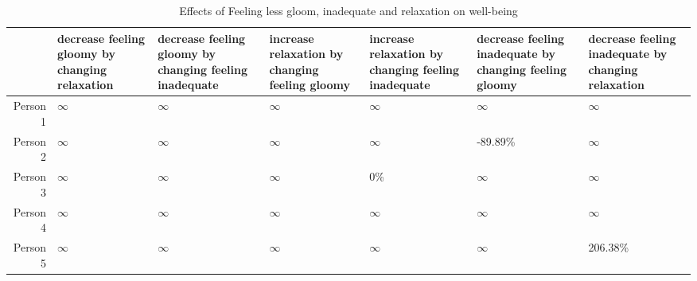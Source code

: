\begin{table*}[ht]
\centering
\begin{tabular}{rllllll}
  \toprule
 & decrease feeling gloomy by changing relaxation & decrease feeling gloomy by changing feeling inadequate & increase relaxation by changing feeling gloomy & increase relaxation by changing feeling inadequate & decrease feeling inadequate by changing feeling gloomy & decrease feeling inadequate by changing relaxation \\ 
  \midrule
Person 1 & $\infty$ & $\infty$ & $\infty$ & $\infty$ & $\infty$ & $\infty$ \\ 
  Person 2 & $\infty$ & $\infty$ & $\infty$ & $\infty$ & -89.89\% & $\infty$ \\ 
  Person 3 & $\infty$ & $\infty$ & $\infty$ & 0\% & $\infty$ & $\infty$ \\ 
  Person 4 & $\infty$ & $\infty$ & $\infty$ & $\infty$ & $\infty$ & $\infty$ \\ 
  Person 5 & $\infty$ & $\infty$ & $\infty$ & $\infty$ & $\infty$ & 206.38\% \\ 
   \bottomrule
\end{tabular}
\caption{Effects of Feeling less gloom, inadequate and relaxation on well-being} 
\label{tab:percentage_effects_in_aira}
\end{table*}
